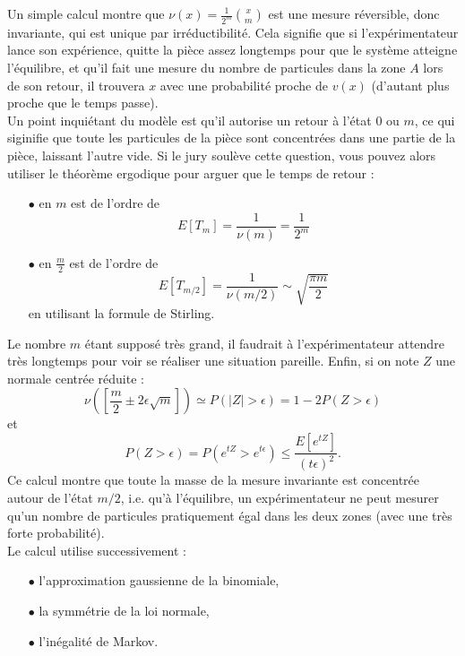 Un simple calcul montre que $\nu(x)=\frac{1}{2^m}\binom{x}{m}$ est une mesure réversible, donc invariante, qui est unique par irréductibilité. Cela signifie que si l'expérimentateur lance son expérience, quitte la pièce assez longtemps pour que le système atteigne l'équilibre, et qu'il fait une mesure du nombre de particules dans la zone $A$ lors de son retour, il trouvera $x$ avec une probabilité proche de $v(x)$ (d'autant plus proche que le temps passe).\\

Un point inquiétant du modèle est qu'il autorise un retour à l'état $0$ ou $m$, ce qui siginifie que toute les particules de la pièce sont concentrées dans une partie de la pièce, laissant l'autre vide. Si le jury soulève cette question, vous pouvez alors utiliser le théorème ergodique pour arguer que le temps de retour :\\

\begin{itemize}
\item[$\bullet$] en $m$ est de l'ordre de 
\[E[T_m]=\frac{1}{\nu(m)}=\frac{1}{2^m} \]
\item[$\bullet$] en $\frac{m}{2}$ est de l'ordre de 
\[E[T_{m/2}]=\frac{1}{\nu(m/2)}\sim\sqrt{\frac{\pi m}{2}} \]
en utilisant la formule de Stirling.\\
\end{itemize}

Le nombre $m$ étant supposé très grand, il faudrait à l'expérimentateur attendre très longtemps pour voir se réaliser une situation pareille. Enfin, si on note $Z$ une normale centrée réduite :
\[\nu([\frac{m}{2}\pm 2\epsilon \sqrt{m}]) \simeq P(|Z|>\epsilon)=1-2P(Z>\epsilon) \]
et 
\[P(Z>\epsilon)=P(e^{tZ}>e^{t\epsilon})\leq \frac{E[e^{tZ}]}{(t\epsilon)^2}.\]
Ce calcul montre que toute la masse de la mesure invariante est concentrée autour de l'état $m/2$, i.e. qu'à l'équilibre, un expérimentateur ne peut mesurer qu'un nombre de particules pratiquement égal dans les deux zones (avec une très forte probabilité).\\

Le calcul utilise successivement :
\begin{itemize}
\item[$\bullet$] l'approximation gaussienne de la binomiale,
\item[$\bullet$] la symmétrie de la loi normale,
\item[$\bullet$] l'inégalité de Markov.
\end{itemize}














